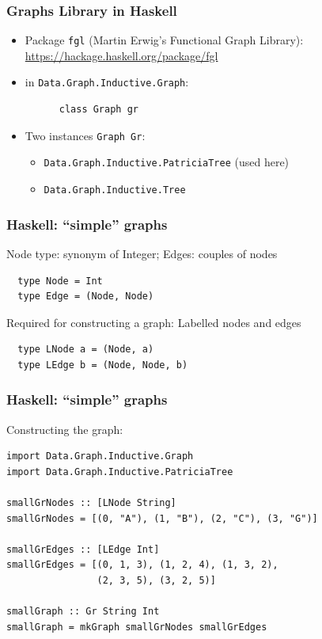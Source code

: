 \begin{frame}[fragile]\frametitle{Graphs Library in Haskell}

  \begin{itemize}
  \item Package \texttt{fgl} (Martin Erwig's Functional Graph Library):
    \url{https://hackage.haskell.org/package/fgl}

  \item in \texttt{Data.Graph.Inductive.Graph}:
    \begin{lstlisting}
      class Graph gr
    \end{lstlisting}    

  \item Two instances \texttt{Graph Gr}:
    \begin{itemize}
    \item \texttt{Data.Graph.Inductive.PatriciaTree} (used here)
    \item \texttt{Data.Graph.Inductive.Tree}
    \end{itemize}
    
  \end{itemize}

\end{frame}


\begin{frame}[fragile]\frametitle{Haskell: ``simple'' graphs}

  Node type: synonym of Integer; Edges: couples of nodes

\begin{lstlisting}
  type Node = Int
  type Edge = (Node, Node)
\end{lstlisting}
  
Required for constructing a graph: Labelled nodes and edges

\begin{lstlisting}
  type LNode a = (Node, a)
  type LEdge b = (Node, Node, b) 
\end{lstlisting}

\end{frame}

\begin{frame}[fragile]\frametitle{Haskell: ``simple'' graphs}

Constructing the graph:
\small
\begin{lstlisting}
import Data.Graph.Inductive.Graph
import Data.Graph.Inductive.PatriciaTree
  
smallGrNodes :: [LNode String]
smallGrNodes = [(0, "A"), (1, "B"), (2, "C"), (3, "G")]

smallGrEdges :: [LEdge Int]
smallGrEdges = [(0, 1, 3), (1, 2, 4), (1, 3, 2),
                (2, 3, 5), (3, 2, 5)]

smallGraph :: Gr String Int
smallGraph = mkGraph smallGrNodes smallGrEdges
\end{lstlisting}
\normalsize
\end{frame}


